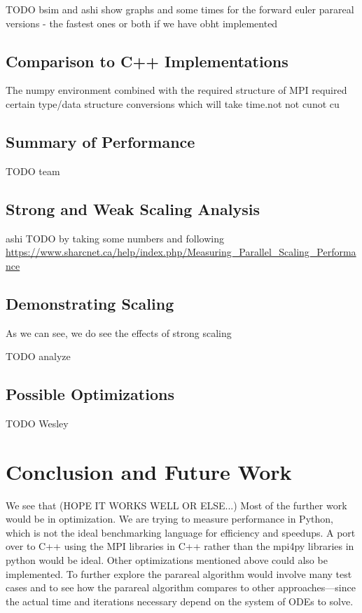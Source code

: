 \documentclass[letterpaper,twocolumn,11pt]{article}
\begin{document}
TODO bsim and ashi show graphs and some times for the forward euler parareal versions - the fastest ones or both if we have obht implemented

\subsection{Comparison to C++ Implementations}

The numpy environment combined with the required structure of MPI required
certain type/data structure conversions which will take time.not not cunot
cu

\subsection{Summary of Performance}

TODO team

\subsection{Strong and Weak Scaling Analysis}

ashi TODO by taking some numbers and following
\url{https://www.sharcnet.ca/help/index.php/Measuring_Parallel_Scaling_Performance}

\subsection{Demonstrating Scaling}

As we can see, we do see the effects of strong scaling

TODO analyze

\subsection{Possible Optimizations}

TODO Wesley

\section{Conclusion and Future Work}

We see that (HOPE IT WORKS WELL OR ELSE...) Most of the further work would be in
optimization. We are trying to measure performance in Python, which is not the
ideal benchmarking language for efficiency and speedups. A port over to C++
using the MPI libraries in C++ rather than the mpi4py libraries in python would
be ideal. Other optimizations mentioned above could also be implemented. To
further explore the parareal algorithm would involve many test cases and to see
how the parareal algorithm compares to other approaches---since the actual time
and iterations necessary depend on the system of ODEs to solve.
\end{document}
